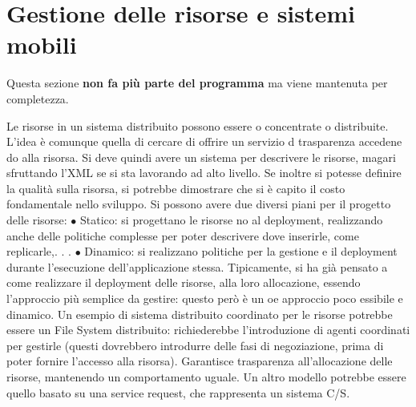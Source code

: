 \section{Gestione delle risorse e sistemi mobili}
Questa sezione \textbf{non fa più parte del programma} ma viene mantenuta per completezza.

Le risorse in un sistema distribuito possono essere o concentrate o distribuite.
L'idea è comunque quella di cercare di offrire un servizio d trasparenza accedene
do alla risorsa.
Si deve quindi avere un sistema per descrivere le risorse, magari sfruttando
l'XML se si sta lavorando ad alto livello. Se inoltre si potesse definire la qualità
sulla risorsa, si potrebbe dimostrare che si è capito il costo fondamentale nello
sviluppo.
Si possono avere due diversi piani per il progetto delle risorse:
$\bullet$ Statico: si progettano le risorse no al deployment, realizzando anche delle
politiche complesse per poter descrivere dove inserirle, come replicarle,. . .
$\bullet$ Dinamico: si realizzano politiche per la gestione e il deployment durante
l'esecuzione dell'applicazione stessa.
Tipicamente, si ha già pensato a come realizzare il deployment delle risorse, alla
loro allocazione, essendo l'approccio più semplice da gestire: questo però è un
oe
approccio poco essibile e dinamico.
Un esempio di sistema distribuito coordinato per le risorse potrebbe essere
un File System distribuito: richiederebbe l'introduzione di agenti coordinati per
gestirle (questi dovrebbero introdurre delle fasi di negoziazione, prima di poter
fornire l'accesso alla risorsa). Garantisce trasparenza all'allocazione delle risorse,
mantenendo un comportamento uguale. Un altro modello potrebbe essere quello
basato su una service request, che rappresenta un sistema C/S.
